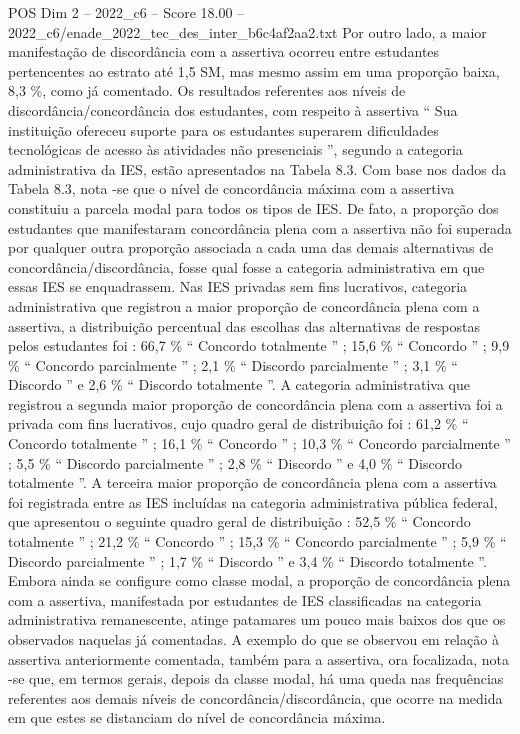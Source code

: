\begin{textsample}{POS Dim 2 – 2022\_c6 – Score 18.00 – 2022\_c6/enade\_2022\_tec\_des\_inter\_b6c4af2aa2.txt}
Por outro lado, a maior manifestação de discordância com a assertiva ocorreu entre estudantes pertencentes ao estrato até 1,5 SM, mas mesmo assim em uma proporção baixa, 8,3 \%, como já comentado.
Os resultados referentes aos níveis de discordância/concordância dos estudantes, com respeito à assertiva “ Sua instituição ofereceu suporte para os estudantes superarem dificuldades tecnológicas de acesso às atividades não presenciais ”, segundo a categoria administrativa da IES, estão apresentados na Tabela 8.3.
Com base nos dados da Tabela 8.3, nota -se que o nível de concordância máxima com a assertiva constituiu a parcela modal para todos os tipos de IES.
De fato, a proporção dos estudantes que manifestaram concordância plena com a assertiva não foi superada por qualquer outra proporção associada a cada uma das demais alternativas de concordância/discordância, fosse qual fosse a categoria administrativa em que essas IES se enquadrassem.
Nas IES privadas sem fins lucrativos, categoria administrativa que registrou a maior proporção de concordância plena com a assertiva, a distribuição percentual das escolhas das alternativas de respostas pelos estudantes foi : 66,7 \% “ Concordo totalmente ” ; 15,6 \% “ Concordo ” ; 9,9 \% “ Concordo parcialmente ” ; 2,1 \% “ Discordo parcialmente ” ; 3,1 \% “ Discordo ” e 2,6 \% “ Discordo totalmente ”.
A categoria administrativa que registrou a segunda maior proporção de concordância plena com a assertiva foi a privada com fins lucrativos, cujo quadro geral de distribuição foi : 61,2 \% “ Concordo totalmente ” ; 16,1 \% “ Concordo ” ; 10,3 \% “ Concordo parcialmente ” ; 5,5 \% “ Discordo parcialmente ” ; 2,8 \% “ Discordo ” e 4,0 \% “ Discordo totalmente ”.
A terceira maior proporção de concordância plena com a assertiva foi registrada entre as IES incluídas na categoria administrativa pública federal, que apresentou o seguinte quadro geral de distribuição : 52,5 \% “ Concordo totalmente ” ; 21,2 \% “ Concordo ” ; 15,3 \% “ Concordo parcialmente ” ; 5,9 \% “ Discordo parcialmente ” ; 1,7 \% “ Discordo ” e 3,4 \% “ Discordo totalmente ”.
Embora ainda se configure como classe modal, a proporção de concordância plena com a assertiva, manifestada por estudantes de IES classificadas na categoria administrativa remanescente, atinge patamares um pouco mais baixos dos que os observados naquelas já comentadas.
A exemplo do que se observou em relação à assertiva anteriormente comentada, também para a assertiva, ora focalizada, nota -se que, em termos gerais, depois da classe modal, há uma queda nas frequências referentes aos demais níveis de concordância/discordância, que ocorre na medida em que estes se distanciam do nível de concordância máxima.

\end{textsample}
